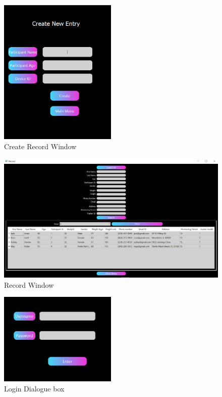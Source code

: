 \documentclass[12pt, titlepage]{article}
\begin{document}
\begin{figure}[H]
	\begin{center}
		 \includegraphics[width=0.5\textwidth]{CreateRecord}
		\caption{Create Record Window}
		\label{CreateRecord} 
	\end{center}
\end{figure}

\begin{figure}[H]
	\begin{center}
		 \includegraphics[width=1\textwidth]{Record}
		\caption{Record Window}
		\label{Record} 
	\end{center}
\end{figure}

\begin{figure}[H]
	\begin{center}
		 \includegraphics[width=0.5\textwidth]{login}
		\caption{Login Dialogue box}
		\label{Login} 
	\end{center}
\end{figure}
\end{document}
